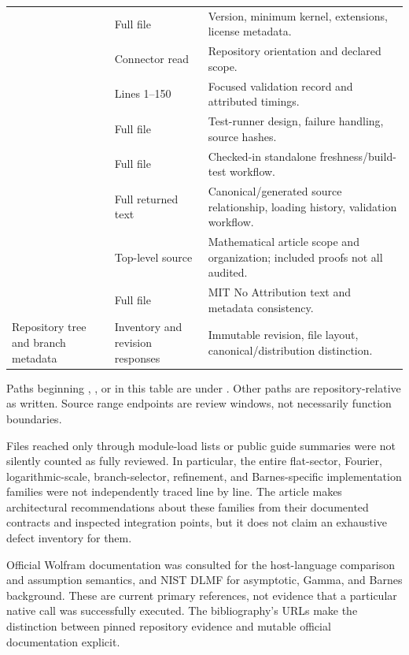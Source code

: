 \begin{longtable}{P{0.43\textwidth}P{0.2\textwidth}P{0.27\textwidth}}
 & Full file & Version, minimum kernel, extensions, license metadata. \\
 & Connector read & Repository orientation and declared scope. \\
 & Lines 1--150 & Focused validation record and attributed timings. \\
 & Full file & Test-runner design, failure handling, source hashes. \\
 & Full file & Checked-in standalone freshness/build-test workflow. \\
 & Full returned text & Canonical/generated source relationship, loading history, validation workflow. \\
 & Top-level source & Mathematical article scope and organization; included proofs not all audited. \\
 & Full file & MIT No Attribution text and metadata consistency. \\
Repository tree and branch metadata & Inventory and revision responses & Immutable revision, file layout, canonical/distribution distinction. \\
\bottomrule
\end{longtable}
Paths beginning , , or  in this table are under . Other paths are repository-relative as written. Source range endpoints are review windows, not necessarily function boundaries.

Files reached only through module-load lists or public guide summaries were not silently counted as fully reviewed. In particular, the entire flat-sector, Fourier, logarithmic-scale, branch-selector, refinement, and Barnes-specific implementation families were not independently traced line by line. The article makes architectural recommendations about these families from their documented contracts and inspected integration points, but it does not claim an exhaustive defect inventory for them.

Official Wolfram documentation was consulted for the host-language comparison and assumption semantics, and NIST DLMF for asymptotic, Gamma, and Barnes background. These are current primary references, not evidence that a particular native call was successfully executed. The bibliography's URLs make the distinction between pinned repository evidence and mutable official documentation explicit.
